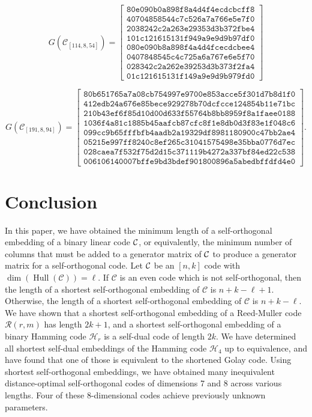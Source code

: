 \documentclass{article}
\theoremstyle{definition}
\theoremstyle{remark}
\newcommand{\C}{\mbox{$\cal C$}}
\newcommand{\Hull}{\operatorname{Hull}}
\begin{document}
\[
G(\mathcal{C}_{[114, 8, 54]})=\left[
\begin{array}{c}
\texttt{80e090b0a898f8a4d4f4ecdcbcff8} \\
\texttt{40704858544c7c526a7a766e5e7f0} \\
\texttt{2038242c2a263e29353d3b372fbe4} \\
\texttt{101c121615131f949a9e9d9b97df0} \\
\texttt{080e090b8a898f4a4d4fcecdcbee4} \\
\texttt{0407848545c4c725a6a767e6e5f70} \\
\texttt{028342c2a262e39253d3b373f2fa4} \\
\texttt{01c121615131f149a9e9d9b979fd0}
\end{array}
\right]
\]

\[
G(\mathcal{C}_{[191, 8, 94]})=\left[
\begin{array}{c}
\texttt{80b651765a7a08cb754997e9700e853acce5f301d7b8d1f0} \\
\texttt{412edb24a676e85bece929278b70dcfcce124854b11e71bc} \\
\texttt{210b43ef6f85d10d00d633f55764b8bb8959f8a1faee0188} \\
\texttt{1036f4a81c1885b45aafcb87cfc8f1e8db0d3f83e1f048c6} \\
\texttt{099cc9b65fffbfb4aadb2a19329df8981180900c47bb2ae4} \\
\texttt{05215e997ff8240c8ef265c31041575498e35bba0776d7ec} \\
\texttt{028caea7f532f75d2d15c371119b4272a337bf84ed22c538} \\
\texttt{006106140007bffe9bd3bdef901800896a5abedbffdfd4e0}
\end{array}
\right].
\]
\section{Conclusion}
In this paper, we have obtained the minimum length of a self-orthogonal embedding of a binary linear code $\C$, or equivalently, the minimum number of columns that must be added to a generator matrix of $\C$ to produce a generator matrix for a self-orthogonal code. Let $\C$ be an $[n,k]$ code with $\dim(\Hull(\mathcal{C}))=\ell$. If $\mathcal{C}$ is an even code which is not self-orthogonal, then the length of a shortest self-orthogonal embedding of $\mathcal{C}$ is $n+k-\ell+1$. Otherwise, the length of a shortest self-orthogonal embedding of $\mathcal{C}$ is $n+k-\ell$. We have shown that a shortest self-orthogonal embedding of a Reed-Muller code $\mathcal{R}(r, m)$ has length $2k+1$, and a shortest self-orthogonal embedding of a binary Hamming code $\mathcal{H}_r$ is a self-dual code of length $2k$. We have determined all shortest self-dual embeddings of the Hamming code $\mathcal{H}_4$ up to equivalence, and have found that one of those is equivalent to the shortened Golay code. Using shortest self-orthogonal embeddings, we have obtained many inequivalent distance-optimal self-orthogonal codes of dimensions 7 and 8 across various lengths. Four of these 8-dimensional codes achieve previously unknown parameters.
\end{document}
